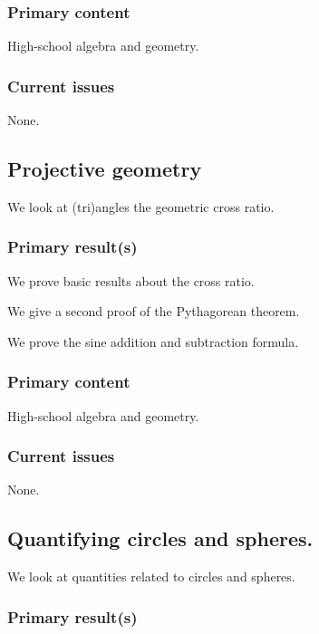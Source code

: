 \documentclass{amsart}
\begin{document}
\subsubsection{Primary content}

High-school algebra and geometry.

\subsubsection{Current issues}

None.




\subsection{Projective geometry}

We look at (tri)angles the geometric cross ratio.

\subsubsection{Primary result(s)}


We prove basic results about the cross ratio.

We give a second proof of the Pythagorean theorem.

We prove the sine addition and subtraction formula. 


\subsubsection{Primary content}

High-school algebra and geometry.

\subsubsection{Current issues}

None.




\subsection{Quantifying circles and spheres.}

We look at quantities related to circles and spheres.


\subsubsection{Primary result(s)}
\end{document}
